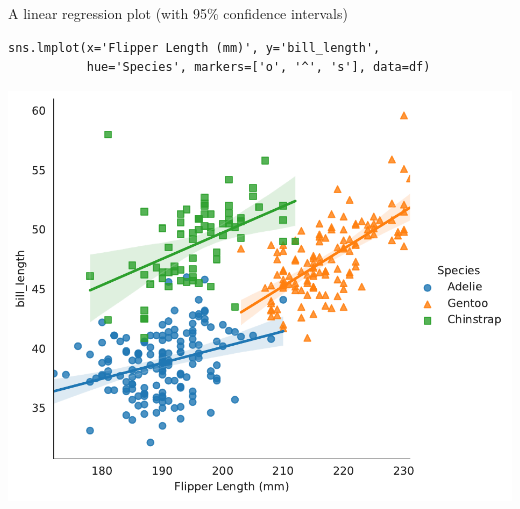 \documentclass[aspectratio=169,usenames,dvipsnames]{beamer}
\begin{document}
\begin{frame}[fragile]{A linear regression plot (with 95\% confidence intervals)}
\vspace{-0.5em}
\begin{lstlisting}
sns.lmplot(x='Flipper Length (mm)', y='bill_length',
           hue='Species', markers=['o', '^', 's'], data=df)
\end{lstlisting}

\includegraphics[height=0.7\textheight]{fig/scatterpenguins2}
\end{frame}





\end{document}
